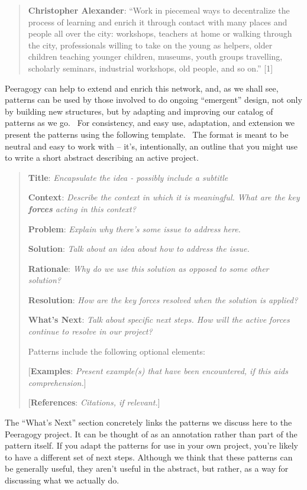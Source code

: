 \begin{quote}
\textbf{Christopher Alexander}: ``Work in piecemeal ways to decentralize
the process of learning and enrich it through contact with many places
and people all over the city: workshops, teachers at home or walking
through the city, professionals willing to take on the young as helpers,
older children teaching younger children, museums, youth groups
travelling, scholarly seminars, industrial workshops, old people, and so
on.'' {{[}1{]}}
\end{quote}

Peeragogy can help to extend and enrich this network, and, as we shall
see, patterns can be used by those involved to do ongoing ``emergent''
design, not only by building new structures, but by adapting and
improving our catalog of patterns as we go.~ For consistency, and easy
use, adaptation, and extension we present the patterns using the
following template.~ The format is meant to be neutral and easy to work
with -- it's, intentionally, an outline that you might use to write a
short abstract describing an active project.

\begin{quote}
\textbf{Title}: \emph{Encapsulate the idea - possibly include a
subtitle}

\textbf{Context}: \emph{Describe the context in which it is meaningful.
What are the key \textbf{forces} acting in this context?}

\textbf{Problem}: \emph{Explain why there's some issue to address here.}

\textbf{Solution}: \emph{Talk about an idea about how to address the
issue.}

\textbf{Rationale}: \emph{Why do we use this solution as opposed to some
other solution?}

\textbf{Resolution}: \emph{How are the key forces resolved when the
solution is applied?}

\textbf{What's Next}: \emph{Talk about specific next steps. How will the
active forces continue to resolve in our project?}

Patterns include the following optional elements:

{{[}\textbf{Examples}: \emph{Present example(s) that have been
encountered, if this aids comprehension.}{]}}

{{[}\textbf{References}: \emph{Citations, if relevant.}{]}}
\end{quote}

The ``What's Next'' section concretely links the patterns we discuss
here to the Peeragogy project. It can be thought of as an annotation
rather than part of the pattern itself. If you adapt the patterns for
use in your own project, you're likely to have a different set of next
steps. Although we think that these patterns can be generally useful,
they aren't useful in the abstract, but rather, as a way for discussing
what we actually do.

